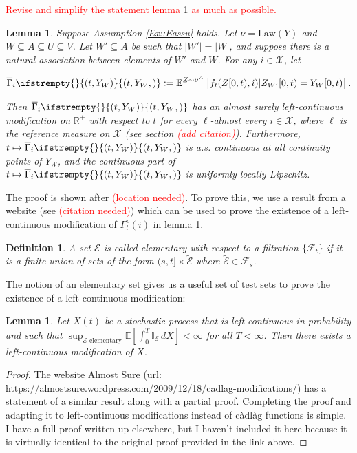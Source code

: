 \documentclass[12pt]{article}
\newcommand{\mb}{\mathbb}
\newcommand{\mc}{\mathcal}
\newcommand{\ov}{\overline}
\newcommand{\te}{\text}
\newcommand{\tr}{\textcolor{red}}
\newcommand{\ind}{\hspace{24pt}}
\newcommand{\ex}[1]{\mb{E}\left[#1\right]}			%
\newcommand{\exmu}[2]{\mb{E}^{#1}\left[#2\right]}	%
\newcommand{\defeq}{:=}								%
\newcommand{\sta}{\mc{X}}							%
\newcommand{\Xf}{X}									%
\newcommand{\F}{\mc{F}}								%
\newcommand{\vind}[1]{_{#1}}						%
\newcommand{\tme}[1]{(#1)}							%
\newcommand{\tmi}[1]{#1}							%
\newcommand{\vpara}[1]{^{#1}}						%
\newcommand{\stpara}[1]{_{#1}}						%
\newcommand{\tpara}[1]{_{#1}}						%
\newcommand{\tmepro}[3]{
\ifstrempty{#3}{
	(#1,#2)}{
	(#1,#2,#3)}}									%
\newcommand{\evnt}{\mc{E}}						%
\newcommand{\Xg}{Y}									%
\newcommand{\alt}[1]{\tilde{#1}}					%
\newcommand{\ratee}{\Gamma}							%
\newcommand{\grate}{\ov{\ratee}}					%
\newcommand{\mm}{\nu}								%
\newcommand{\law}{\te{Law}}							%
\newcommand{\Xh}{Z}									%
\newtheorem{lem}[thms]{Lemma}
\newtheorem{defn}[thms]{Definition}
\begin{document}
\ind \tr{Revise and simplify the statement lemma \ref{Ex::leftmod} as much as possible.}
\begin{lem}
Suppose Assumption \ref{Ex::Eassu} holds. Let \(\mm = \law(\Xg)\) and \(W\subseteq A \subseteq U\subseteq V\). Let \(W'\subseteq A\) be such that \(|W'| = |W|\), and suppose there is a natural association between elements of \(W'\) and \(W\). For any \(i \in \sta\), let

\[\grate\stpara{i}\tmepro{t}{\Xg\vind{W}}{} \defeq \exmu{\Xh\sim \mm\vpara{A}}{f_t(\Xh\tmi{[0,t)},i)|\Xh\vind{W'}\tmi{[0,t)} = \Xg\vind{W}\tmi{[0,t)}}.\]

Then \(\grate\stpara{i}\tmepro{t}{\Xg\vind{W}}{}\) has an almost surely left-continuous modification on \(\mb{R}^+\) with respect to \(t\) for every \(\ell\)-almost every \(i \in \sta\), where \(\ell\) is the reference measure on \(\sta\) (see section \tr{(add citation)}). Furthermore, \(t\mapsto\grate\stpara{i}\tmepro{t}{\Xg\vind{W}}{}\) is a.s. continuous at all continuity points of \(\Xg\vind{W}\), and the continuous part of \(t\mapsto\grate\stpara{i}\tmepro{t}{\Xg\vind{W}}{}\) is uniformly locally Lipschitz.
\label{Ex::leftmod}
\end{lem}

The proof is shown after \tr{(location needed)}. To prove this, we use a result from a website (see \tr{(citation needed)}) which can be used to prove the existence of a left-continuous modification of \(\ratee\vpara{v}\tpara{t}(i)\) in lemma \ref{Ex::leftmod}.

\begin{defn}
A set \(\evnt\) is called elementary with respect to a filtration \(\{\F\tpara{t}\}\) if it is a finite union of sets of the form \((s,t]\times \alt{\evnt}\) where \(\alt{\evnt} \in \F\tpara{s}\).
\label{Ex::elementary}
\end{defn}

The notion of an elementary set gives us a useful set of test sets to prove the existence of a left-continuous modification:

\begin{lem}
Let \(\Xf\tme{t}\) be a stochastic process that is left continuous in probability and such that \(\sup_{\evnt\te{ elementary}}\ex{\int_0^T \mb{I}_\evnt\,d\Xf} < \infty\) for all \(T < \infty\). Then there exists a left-continuous modification of \(\Xf\).
\label{Ex::leftmodgen}
\end{lem}
\begin{proof}
The website Almost Sure (url: https://almostsure.wordpress.com/2009/12/18/cadlag-modifications/) has a statement of a similar result along with a partial proof. Completing the proof and adapting it to left-continuous modifications instead of c\`adl\`ag functions is simple. I have a full proof written up elsewhere, but I haven't included it here because it is virtually identical to the original proof provided in the link above.
\end{proof}
\end{document}
